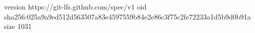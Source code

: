 version https://git-lfs.github.com/spec/v1
oid sha256:025a9a9ed512d563507a83e4597559b84e2e86c3f75c2fe72233a1d5b9d0b91a
size 1031
